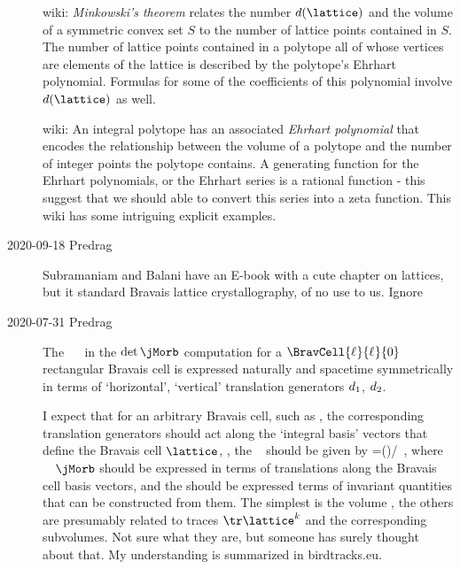 \begin{description}
 {wiki}:
{\em Minkowski's theorem} relates the number $d(\lattice)$ and the volume of
a symmetric convex set $S$ to the number of lattice points
contained in $S$. The number of lattice points contained in a
polytope all of whose vertices are elements of the lattice is
described by the polytope's Ehrhart polynomial. Formulas for some of
the coefficients of this polynomial involve $d(\lattice)$ as well.

 {wiki}:
An integral polytope has an associated {\em Ehrhart polynomial} that
encodes the relationship between the volume of a polytope and the number
of integer points the polytope contains. A generating function for the
Ehrhart polynomials, or the Ehrhart series is a rational function - this
suggest that we should able to convert this series into a zeta function.
This wiki has some intriguing explicit examples.

\item[2020-09-18 Predrag]
Subramaniam and Balani have an
 {E-book}
with a cute chapter on
 {lattices},
but it standard Bravais lattice crystallography, of no use to us. Ignore

\item[2020-07-31 Predrag]
The \catlatt\ \jacobianOrb\ 
in the {\HillDet} $\det{\jMorb}$ computation for a
$\BravCell{\speriod{}}{\period{}}{0}$ rectangular Bravais cell is
expressed naturally and spacetime symmetrically in terms of `horizontal',
`vertical' translation generators $d_{1}$, $d_{2}$.

I expect that for an arbitrary Bravais cell, such as
, the corresponding translation generators should
act along the `integral basis' vectors  that define the
Bravais cell $\lattice$, \ie, the \catlatt\ {\HillDet} should be given by
\beq
\det{\mathbf{\jMorb}}=\det({\mathbf{\jMorb}\lattice)}/\det{\lattice}
\,,
where \catlatt\ \jacobianOrb\ ${\mathbf{\jMorb}}$ should be expressed in
terms of translations along the Bravais cell basis vectors, and the
{\HillDet} should be expressed terms of invariant quantities that can be
constructed from them. The simplest is the volume , the
others are presumably related to traces $\tr\lattice^k$ and the
corresponding subvolumes. Not sure what they are, but someone has surely
thought about that. My understanding is summarized in
{birdtracks.eu}.


\end{description}

